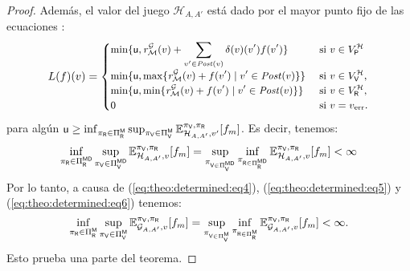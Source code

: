 \begin{proof}
    Además, el valor del juego $\mathcal{H}_{A,A'}$ está dado por el mayor punto fijo de las ecuaciones \cite{CastroDDP22}:
\begin{equation}\label{eq:theo:determined:bellman1}\small
    L(f)(v) =
    \begin{cases}
           \displaystyle \min \{\mathsf{u}, \mathit{r}_{\mathcal{M}}^{\mathcal{G}}(v) + \sum_{v' \in \mathit{Post}(v)} \delta(v)(v')  f(v') \} & \text{ si } v \in V^{\mathcal{H}}_{\mathsf{P}}  \\
           \displaystyle \min \{\mathsf{u},  \max \{\mathit{r}_{\mathcal{M}}^{\mathcal{G}}(v) +f(v') \mid v' \in \mathit{Post}(v) \} \} & \text{ si } v \in  V^{\mathcal{H}}_{\mathsf{V}}, \\
           \displaystyle \min \{\mathsf{u},  \min \{\mathit{r}_{\mathcal{M}}^{\mathcal{G}}(v)  + f(v') \mid v' \in \mathit{Post}(v) \} \} & \text{ si } v \in  V^{\mathcal{H}}_{\mathsf{R}}, \\
           \displaystyle 0 & \text{ si } v=v_{\text{err}}.
           \displaystyle 
    \end{cases}
\end{equation}
    para algún $\mathsf{u} \geq \inf_{\pi_{\mathsf{R}} \in \Pi_{\mathsf{R}}^{\mathsf{M}}} \sup_{\pi_{\mathsf{V}} \in \Pi_{\mathsf{V}}^{\mathsf{M}}} \mathbb{E}_{\mathcal{H}_{A,A'},v'}^{\pi_{\mathsf{V}},\pi_{\mathsf{R}}}[f_{m}]$.
    Es decir, tenemos:
\begin{equation}\label{eq:theo:determined:eq6}
    \inf_{\pi_{\mathsf{R}} \in \Pi_{\mathsf{R}}^{\mathsf{M}\mathsf{D}}} \sup_{\pi_{\mathsf{V}} \in \Pi_{\mathsf{V}}^{\mathsf{M}\mathsf{D}}}  \mathbb{E}^{\pi_{\mathsf{V}},\pi_{\mathsf{R}}}_{\mathcal{H}_{A,A'}, v}[f_{m}] 
    = \sup_{\pi_{\mathsf{V} \in \Pi_{\mathsf{V}}^{\mathsf{M}\mathsf{D}}}} \inf_{\pi_{\mathsf{R} \in \Pi_{\mathsf{R}}^{\mathsf{M}\mathsf{D}}}}    \mathbb{E}^{\pi_{\mathsf{V}},\pi_{\mathsf{R}}}_{\mathcal{H}_{A,A'}, v}[f_{m}] 
    < \infty
\end{equation}
  Por lo tanto, a causa de (\ref{eq:theo:determined:eq4}),  (\ref{eq:theo:determined:eq5}) y (\ref{eq:theo:determined:eq6}) tenemos:
\[
 \inf_{\pi_{\mathsf{R}} \in \Pi_{\mathsf{R}}^{\mathsf{M}}} \sup_{\pi_{\mathsf{V}} \in \Pi_{\mathsf{V}}^{\mathsf{M}}}  \mathbb{E}^{\pi_{\mathsf{V}},\pi_{\mathsf{R}}}_{\mathcal{G}_{A,A'}, v}[f_{m}] 
    = \sup_{\pi_{\mathsf{V} \in \Pi_{\mathsf{V}}^{\mathsf{M}}}} \inf_{\pi_{\mathsf{R} \in \Pi_{\mathsf{R}}^{\mathsf{M}}}}    \mathbb{E}^{\pi_{\mathsf{V}},\pi_{\mathsf{R}}}_{\mathcal{G}_{A,A'}, v}[f_{m}] 
    < \infty.
\]
    Esto prueba una parte del teorema.

\end{proof}
